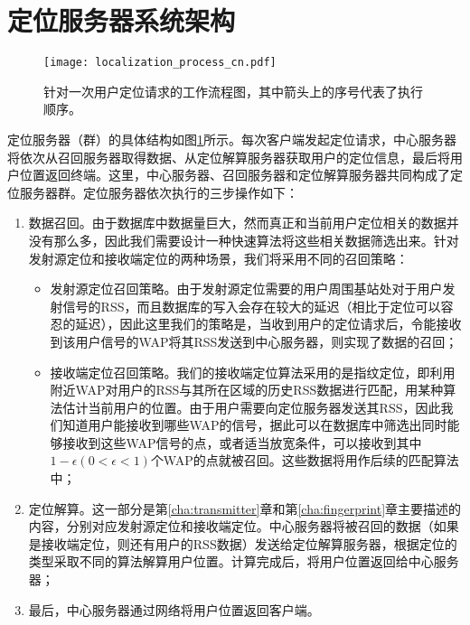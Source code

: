 \section{定位服务器系统架构} \label{sec:loc}

\begin{figure}[tb]
	\centering
	\texttt{[image: localization\_process\_cn.pdf]}
	\caption{针对一次用户定位请求的工作流程图，其中箭头上的序号代表了执行顺序。}
	\label{fig:loc_sys}
\end{figure}

定位服务器（群）的具体结构如图\ref{fig:loc_sys}所示。每次客户端发起定位请求，中心服务器将依次从召回服务器取得数据、从定位解算服务器获取用户的定位信息，最后将用户位置返回终端。这里，中心服务器、召回服务器和定位解算服务器共同构成了定位服务器群。定位服务器依次执行的三步操作如下：
\begin{enumerate}
	\item 数据召回。由于数据库中数据量巨大，然而真正和当前用户定位相关的数据并没有那么多，因此我们需要设计一种快速算法将这些相关数据筛选出来。针对发射源定位和接收端定位的两种场景，我们将采用不同的召回策略：
	\begin{itemize}
		\item 发射源定位召回策略。由于发射源定位需要的用户周围基站处对于用户发射信号的RSS，而且数据库的写入会存在较大的延迟（相比于定位可以容忍的延迟），因此这里我们的策略是，当收到用户的定位请求后，令能接收到该用户信号的WAP将其RSS发送到中心服务器，则实现了数据的召回；
		
		\item 接收端定位召回策略。我们的接收端定位算法采用的是指纹定位，即利用附近WAP对用户的RSS与其所在区域的历史RSS数据进行匹配，用某种算法估计当前用户的位置。由于用户需要向定位服务器发送其RSS，因此我们知道用户能接收到哪些WAP的信号，据此可以在数据库中筛选出同时能够接收到这些WAP信号的点，或者适当放宽条件，可以接收到其中$1-\epsilon (0 < \epsilon < 1)$个WAP的点就被召回。这些数据将用作后续的匹配算法中；
	\end{itemize}
	
	\item 定位解算。这一部分是第\ref{cha:transmitter}章和第\ref{cha:fingerprint}章主要描述的内容，分别对应发射源定位和接收端定位。中心服务器将被召回的数据（如果是接收端定位，则还有用户的RSS数据）发送给定位解算服务器，根据定位的类型采取不同的算法解算用户位置。计算完成后，将用户位置返回给中心服务器；
	
	\item 最后，中心服务器通过网络将用户位置返回客户端。
\end{enumerate}

